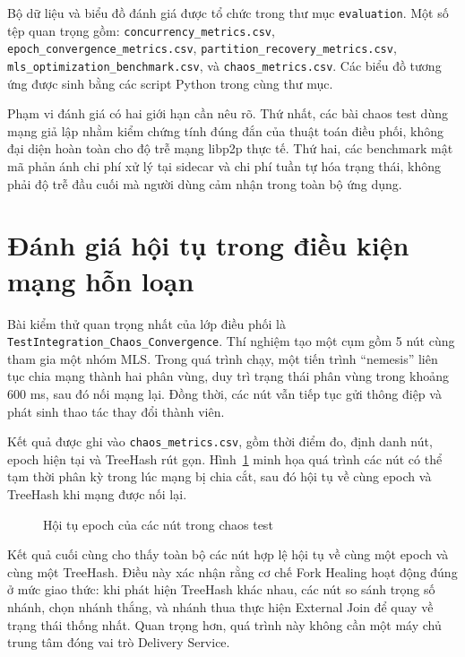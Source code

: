 \documentclass[../DoAn.tex]{subfiles}
\begin{document}
	Bộ dữ liệu và biểu đồ đánh giá được tổ chức trong thư mục \texttt{evaluation}. Một số tệp quan trọng gồm: \texttt{concurrency\_metrics.csv}, \texttt{epoch\_convergence\_metrics.csv}, \texttt{partition\_recovery\_metrics.csv}, \texttt{mls\_optimization\_benchmark.csv}, và \texttt{chaos\_metrics.csv}. Các biểu đồ tương ứng được sinh bằng các script Python trong cùng thư mục.
	
	Phạm vi đánh giá có hai giới hạn cần nêu rõ. Thứ nhất, các bài chaos test dùng mạng giả lập nhằm kiểm chứng tính đúng đắn của thuật toán điều phối, không đại diện hoàn toàn cho độ trễ mạng libp2p thực tế. Thứ hai, các benchmark mật mã phản ánh chi phí xử lý tại sidecar và chi phí tuần tự hóa trạng thái, không phải độ trễ đầu cuối mà người dùng cảm nhận trong toàn bộ ứng dụng.
	
	\section{Đánh giá hội tụ trong điều kiện mạng hỗn loạn}
	\label{sec:danh_gia_chaos}
	
	Bài kiểm thử quan trọng nhất của lớp điều phối là \texttt{TestIntegration\_Chaos\_Convergence}. Thí nghiệm tạo một cụm gồm 5 nút cùng tham gia một nhóm MLS. Trong quá trình chạy, một tiến trình ``nemesis'' liên tục chia mạng thành hai phân vùng, duy trì trạng thái phân vùng trong khoảng 600 ms, sau đó nối mạng lại. Đồng thời, các nút vẫn tiếp tục gửi thông điệp và phát sinh thao tác thay đổi thành viên.
	
	Kết quả được ghi vào \texttt{chaos\_metrics.csv}, gồm thời điểm đo, định danh nút, epoch hiện tại và TreeHash rút gọn. Hình~\ref{fig:chaos_convergence} minh họa quá trình các nút có thể tạm thời phân kỳ trong lúc mạng bị chia cắt, sau đó hội tụ về cùng epoch và TreeHash khi mạng được nối lại.
	
	\begin{figure}[htbp]
		\centering
		\caption{Hội tụ epoch của các nút trong chaos test}
		\label{fig:chaos_convergence}
	\end{figure}
	
	Kết quả cuối cùng cho thấy toàn bộ các nút hợp lệ hội tụ về cùng một epoch và cùng một TreeHash. Điều này xác nhận rằng cơ chế Fork Healing hoạt động đúng ở mức giao thức: khi phát hiện TreeHash khác nhau, các nút so sánh trọng số nhánh, chọn nhánh thắng, và nhánh thua thực hiện External Join để quay về trạng thái thống nhất. Quan trọng hơn, quá trình này không cần một máy chủ trung tâm đóng vai trò Delivery Service.
	
\end{document}
